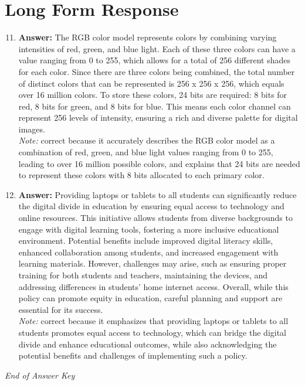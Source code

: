 \documentclass[12pt]{article}
\begin{document}
\section*{Long Form Response}
\begin{enumerate}[label=\arabic*.]
\setcounter{enumi}{10}
\item \textbf{Answer:} The RGB color model represents colors by combining varying intensities of red, green, and blue light. Each of these three colors can have a value ranging from 0 to 255, which allows for a total of 256 different shades for each color. Since there are three colors being combined, the total number of distinct colors that can be represented is 256 x 256 x 256, which equals over 16 million colors. To store these colors, 24 bits are required: 8 bits for red, 8 bits for green, and 8 bits for blue. This means each color channel can represent 256 levels of intensity, ensuring a rich and diverse palette for digital images.
\\ \textit{Note:} correct because it accurately describes the RGB color model as a combination of red, green, and blue light values ranging from 0 to 255, leading to over 16 million possible colors, and explains that 24 bits are needed to represent these colors with 8 bits allocated to each primary color.
\item \textbf{Answer:} Providing laptops or tablets to all students can significantly reduce the digital divide in education by ensuring equal access to technology and online resources. This initiative allows students from diverse backgrounds to engage with digital learning tools, fostering a more inclusive educational environment. Potential benefits include improved digital literacy skills, enhanced collaboration among students, and increased engagement with learning materials. However, challenges may arise, such as ensuring proper training for both students and teachers, maintaining the devices, and addressing differences in students' home internet access. Overall, while this policy can promote equity in education, careful planning and support are essential for its success.
\\ \textit{Note:} correct because it emphasizes that providing laptops or tablets to all students promotes equal access to technology, which can bridge the digital divide and enhance educational outcomes, while also acknowledging the potential benefits and challenges of implementing such a policy.
\end{enumerate}

\vfill
\noindent\textit{End of Answer Key}
\end{document}
